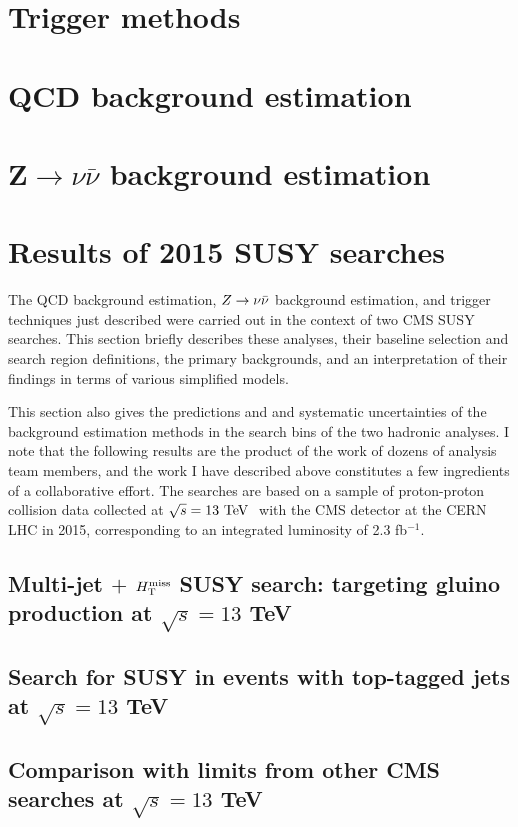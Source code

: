 \section{Trigger methods}
\label{sec:anatrig}


\section{QCD background estimation}
\label{sec:qcd}


\section{Z$\rightarrow\nu\bar{\nu}$ background estimation}
\label{sec:zinv}




\section{Results of 2015 SUSY searches}
\label{sec:2015results}
The QCD background estimation, $Z\rightarrow \nu\bar{\nu}$ background estimation, and trigger techniques just described were carried out in the context of two CMS SUSY searches. This section briefly describes these analyses, their baseline selection and search region definitions, the primary backgrounds, and an interpretation of their findings in terms of various simplified models. 

This section also gives the predictions and and systematic uncertainties of the background estimation methods in the search bins of the two hadronic analyses. I note that the following results are the product of the work of dozens of analysis team members, and the work I have described above constitutes a few ingredients of a collaborative effort. The searches are based on a sample of proton-proton collision data collected at $\sqrt{s}=13~\text{TeV}~$ with the CMS detector at the CERN LHC in 2015, corresponding to an integrated luminosity of 2.3 fb$^{-1}$.

\subsection{Multi-jet $+$ $H_{\text{T}}^{\rm miss}$ SUSY search: targeting gluino production at $\sqrt{s}=13$ TeV}
\label{sec:ra2b2015}

\FloatBarrier

\subsection{Search for SUSY in events with top-tagged jets at $\sqrt{s}=13$ TeV}
\label{sec:hadstop2015}


\FloatBarrier
\subsection{Comparison with limits from other CMS searches at $\sqrt{s}=13$ TeV}
\label{sec:limitsummary}

\FloatBarrier


